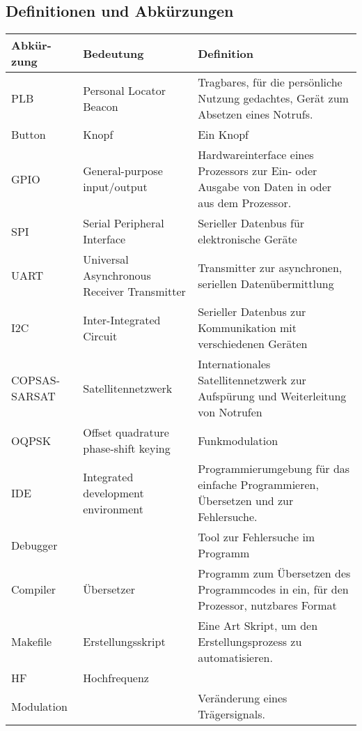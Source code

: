 \subsection{Definitionen und Abkürzungen}
\begin{tabular}{| p{2cm} |p{3cm}| p{11cm} |}
	
	\hline
	\textbf{Abkür-} \newline \textbf{zung} & 
	\textbf{Bedeutung} & \textbf{Definition}\\
	\hline
	
	PLB & 
	Personal Locator Beacon &
	 Tragbares, für die persönliche Nutzung gedachtes, Gerät zum Absetzen eines Notrufs.\\
	\hline
	
	Button & 
	Knopf &
	Ein Knopf \\
	\hline
	
	GPIO & 
	General-purpose input/output &
	Hardwareinterface eines Prozessors zur Ein- oder Ausgabe von Daten in oder aus dem Prozessor.\\ 
	\hline
	
	SPI & 
	Serial Peripheral Interface &
	Serieller Datenbus für elektronische Geräte \\
	\hline
	
	UART &
	Universal Asynchronous Receiver Transmitter &
	Transmitter zur asynchronen, seriellen Datenübermittlung \\
	\hline
	
	I2C &
	Inter-Integrated Circuit &
	Serieller Datenbus zur Kommunikation mit verschiedenen Geräten\\
	\hline
	
	COPSAS- SARSAT & 
	Satellitennetzwerk &
	Internationales Satellitennetzwerk zur Aufspürung und Weiterleitung von Notrufen\\
	\hline
	
	OQPSK & 
	Offset quadrature phase-shift keying &
	Funkmodulation	\\
	\hline
	
	IDE & Integrated development environment
	 & Programmierumgebung für das einfache Programmieren, Übersetzen und zur Fehlersuche.
	\\
	\hline
	
	Debugger & 
	 & Tool zur Fehlersuche im Programm
	\\
	\hline
	
	Compiler & 
	Übersetzer &
	Programm zum Übersetzen des Programmcodes in ein, für den Prozessor, nutzbares Format
	\\
	\hline
	
	Makefile & 
	Erstellungsskript
	& Eine Art Skript, um den Erstellungsprozess zu automatisieren.
	\\
	\hline

	HF & 
	Hochfrequenz
	& 
	\\
	\hline	

	Modulation & 
	& Veränderung eines Trägersignals.
	\\
	\hline
	
\end{tabular}
